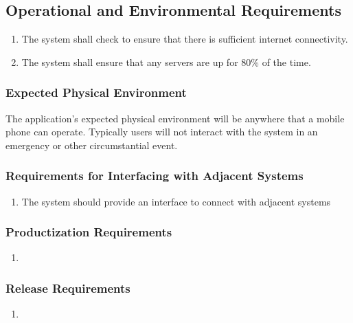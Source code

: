 \documentclass[titlepage]{article}
\begin{document}
		
		\subsection{Operational and Environmental Requirements}
		\label{sub:operational_and_environmental_requirements}
		\begin{enumerate}
			\item
			The system shall check to ensure that there is sufficient internet connectivity.
			\item
			The system shall ensure that any servers are up for 80\% of the time.
		\end{enumerate}
		
		\subsubsection{Expected Physical Environment}
		\label{ssub:expected_physical_environment}
		The application's expected physical environment will be anywhere that a mobile phone can operate. Typically users will not interact with the system in an emergency or other circumstantial event.
		
		\subsubsection{Requirements for Interfacing with Adjacent Systems}
		\label{ssub:requirements_for_interfacing_with_adjacent_systems}
		\begin{enumerate}[{OE}1. ]
			\item 
			The system should provide an interface to connect with adjacent systems 
		\end{enumerate}
		
		\subsubsection{Productization Requirements}
		\label{ssub:productization_requirements}
		\begin{enumerate}[{OE}1. ]
			\item 
		\end{enumerate}
		
		\subsubsection{Release Requirements}
		\label{ssub:release_requirements}
		\begin{enumerate}[{OE}1. ]
			\item 
		\end{enumerate}
		
\end{document}
